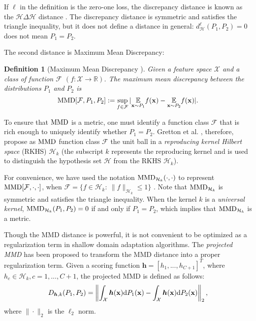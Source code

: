 \documentclass[journal]{IEEEtran}
\newtheorem{Definition}{Definition}
\begin{document}
If $\ell$ in the definition is the zero-one loss, the discrepancy  distance is known as the $\mathcal{H}\Delta \mathcal{H}$ distance \cite{DBLP:conf/nips/Ben-DavidBCP06}. The discrepancy distance is symmetric and satisfies the triangle inequality,
but it does not define a distance in general: $d_{\mathcal{H}}^{\ell}(P_1,P_2)=0$ does not mean $P_1=P_2$.

The second distance is Maximum Mean Discrepancy: 
\begin{Definition}[{Maximum Mean Discrepancy} \cite{gretton2012kernel}]\label{MMD}
Given a feature space $\mathcal{X}$ and a class of function $\mathcal{F}$ $(f:\mathcal{X}\rightarrow \mathbb{R})$. The {maximum
mean discrepancy} between the distributions $P_1$ and $P_2$ is
\begin{equation*}
    \textnormal{MMD}[\mathcal{F},P_1,P_2]:=\sup_{f\in \mathcal{F}}|\underset{{{\mathbf{x}}\sim P_1}}{\mathbb{E}}f({\mathbf{x}})-\underset{{\mathbf{x}}\sim P_2}{\mathbb{E}}f({\mathbf{x}})|.
\end{equation*}
\end{Definition}

To ensure that $\textnormal{MMD}$ is a metric, one must identify a function class ${\mathcal{F}}$ that is rich enough to uniquely identify whether $P_1=P_2$. Gretton et al. \cite{gretton2012kernel}, therefore, propose as $\textnormal{MMD}$ function class ${\mathcal{F}}$ the unit ball in a \textit{reproducing kernel Hilbert space} (RKHS) $\mathcal{H}_{{k}}$ \cite{ghifary2017scatter}  (the subscript $k$ represents the reproducing
kernel and is used to distinguish the hypothesis set $\mathcal{H}$ from the RKHS $\mathcal{H}_{{k}}$).


For convenience, we have used the notation $\textnormal{MMD}_{\mathcal{H}_k}(\cdot,\cdot)$ to represent $\textnormal{MMD}[\mathcal{F},\cdot,\cdot]$, when $\mathcal{F}=\{f\in \mathcal{H}_k:~\|f\|_{\mathcal{H}_k}\leq 1\}$ \cite{gretton2012kernel}.
Note that $\textnormal{MMD}_{\mathcal{H}_k}$  is symmetric and satisfies the triangle inequality. When the kernel $k$ is a \textit{universal kernel}, $\textnormal{MMD}_{\mathcal{H}_k}(P_1,P_2)=0$ if and only if $P_1=P_2$, which implies that $\textnormal{MMD}_{\mathcal{H}_k}$ is a metric.

Though the MMD distance is powerful, it is not convenient to be optimized as a regularization term in shallow domain adaptation algorithms. The \textit{projected MMD} \cite{pan2011domain,ghifary2017scatter,DBLP:conf/cikm/QuanzH09}  has been proposed to transform the MMD distance into a proper regularization term. Given a scoring function ${\bm h}=[h_1,...,h_{C+1}]^T$, where $h_c\in \mathcal{H}_k, c=1,...,C+1$, the projected MMD is defined as follows: 
\begin{equation*}
\begin{split}
    D_{{\bm h},k}(P_1,P_2)=\left\|\int_{\mathcal{X}}{\bm h}(\mathbf{x}){\rm d}P_1(\mathbf{x})-\int_{\mathcal{X}}{\bm h}(\mathbf{x}){\rm d}P_2(\mathbf{x})\right\|_2,
    \end{split}
\end{equation*}
where $\|\cdot\|_2$ is the $\ell_2$ norm.
\end{document}

